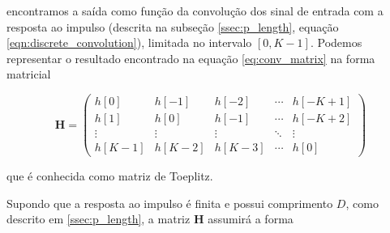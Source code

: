 \documentclass[x11names,a4paper,12pt]{article}
\begin{document}
encontramos a saída como função da convolução dos sinal de entrada com a resposta ao impulso (descrita na subseção \ref{ssec:p_length}, equação \ref{eqn:discrete_convolution}), limitada no intervalo $[0,K-1]$. Podemos representar o resultado encontrado na equação \ref{eq:conv_matrix} na forma matricial

\begin{equation}
  \mathbf{H}=
  \begin{pmatrix}
    h[0] & h[-1] & h[-2] & \cdots & h[-K+1] \\
    h[1] & h[0] & h[-1]  & \cdots & h[-K+2] \\
    \vdots & \vdots & \vdots & \ddots & \vdots \\
    h[K-1] & h[K-2] & h[K-3] & \cdots & h[0]
  \end{pmatrix}
\end{equation}

que é conhecida como matriz de Toeplitz.

Supondo que a resposta ao impulso é finita e possui comprimento $D$, como descrito em \ref{ssec:p_length}, a matriz $\mathbf{H}$ assumirá a forma
\end{document}
